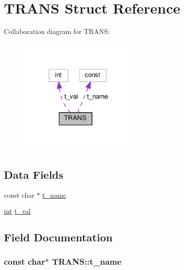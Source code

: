 \hypertarget{structTRANS}{}\section{T\+R\+A\+NS Struct Reference}
\label{structTRANS}


Collaboration diagram for T\+R\+A\+NS\+:
\nopagebreak
\begin{figure}[H]
\begin{center}
\leavevmode
\includegraphics[width=172pt]{structTRANS__coll__graph}
\end{center}
\end{figure}
\subsection*{Data Fields}
\begin{DoxyCompactItemize}
\item 
const char $\ast$ \hyperlink{structTRANS_aaa07cf4951ffe2cb0207d427862f1071}{t\+\_\+name}
\item 
\hyperlink{pcre_8txt_a42dfa4ff673c82d8efe7144098fbc198}{int} \hyperlink{structTRANS_abda2aa4fdb9e09768d979b45d17ae42d}{t\+\_\+val}
\end{DoxyCompactItemize}


\subsection{Field Documentation}
\subsubsection[{\texorpdfstring{t\+\_\+name}{t_name}}]{\setlength{\rightskip}{0pt plus 5cm}const char$\ast$ T\+R\+A\+N\+S\+::t\+\_\+name}\hypertarget{structTRANS_aaa07cf4951ffe2cb0207d427862f1071}{}\label{structTRANS_aaa07cf4951ffe2cb0207d427862f1071}
